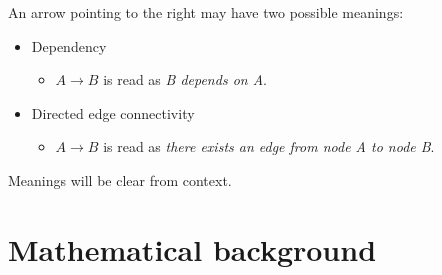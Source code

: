 \documentclass[a4paper,10pt]{article}
\theoremstyle{plain}
\begin{document}
\begin{appendices}
An arrow pointing to the right may have two possible meanings:

\begin{itemize}
  \item Dependency
    \begin{itemize}
      \item $A \to B$ is read as \textit{B depends on A}.
    \end{itemize}
  \item Directed edge connectivity
    \begin{itemize}
      \item $A \to B$ is read as \textit{there exists an edge from node A to node B}.
    \end{itemize}
\end{itemize}

Meanings will be clear from context.

\section{Mathematical background}\label{app:bak}

\end{appendices}

\newpage

\printbibliography[heading=bibintoc]
\end{document}
